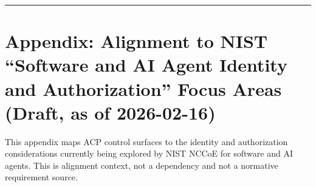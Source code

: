 \documentclass[11pt]{article}
\begin{document}
\vspace{2pt}\begin{center}\rule{0.62\linewidth}{0.6pt}\end{center}\vspace{2pt}

\hypertarget{appendix-alignment-to-nist-software-and-ai-agent-identity-and-authorization-focus-areas-draft-as-of-2026-02-16}{%
\section{Appendix: Alignment to NIST ``Software and AI Agent Identity and Authorization'' Focus Areas (Draft, as of 2026-02-16)}\label{appendix-alignment-to-nist-software-and-ai-agent-identity-and-authorization-focus-areas-draft-as-of-2026-02-16}}

This appendix maps ACP control surfaces to the identity and
authorization considerations currently being explored by NIST NCCoE for
software and AI agents. This is alignment context, not a dependency and
not a normative requirement source.
\end{document}
